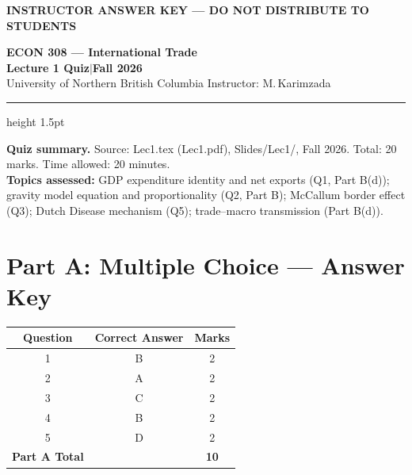 \documentclass[11pt]{article}
\begin{document}

\begin{confidential}
\begin{center}
\large\bfseries\color{AccentRed}
INSTRUCTOR ANSWER KEY — DO NOT DISTRIBUTE TO STUDENTS
\end{center}
\end{confidential}

\vspace{0.5em}

\begin{center}
{\LARGE\bfseries\color{UNBCDark}ECON 308 \;—\; International Trade}\\[0.5em]
{\large\bfseries Lecture 1 Quiz\quad\textcolor{UNBCGold}{$|$}\quad Fall 2026}\\[0.2em]
{\small University of Northern British Columbia\quad
 Instructor: M.\,Karimzada}
\end{center}

\vspace{0.3em}
{\color{UNBCGold}\hrule height 1.5pt}
\vspace{0.5em}

\begin{databox}
\small
\textbf{Quiz summary.}\quad
Source: Lec1.tex (Lec1.pdf), Slides/Lec1/, Fall 2026.\quad
Total: 20 marks.\quad
Time allowed: 20 minutes.\\[0.3em]
\textbf{Topics assessed:}
GDP expenditure identity and net exports (Q1, Part B(d));
gravity model equation and proportionality (Q2, Part B);
McCallum border effect (Q3);
Dutch Disease mechanism (Q5);
trade--macro transmission (Part B(d)).
\end{databox}

\vspace{0.6em}

\section{Part A: Multiple Choice — Answer Key}

\medskip
\begin{center}
\begin{tabular}{ccc}
\toprule
\textbf{Question} & \textbf{Correct Answer} & \textbf{Marks}\\
\midrule
1 & B & 2\\
2 & A & 2\\
3 & C & 2\\
4 & B & 2\\
5 & D & 2\\
\midrule
\textbf{Part A Total} & & \textbf{10}\\
\bottomrule
\end{tabular}
\end{center}
\end{document}
